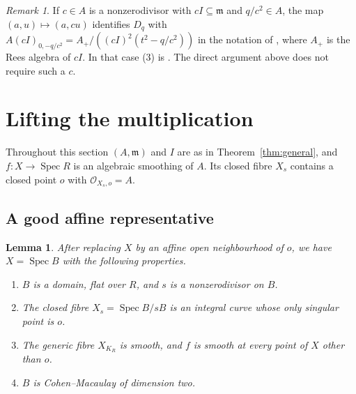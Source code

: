 \documentclass{amsart}
\newtheorem{lemma}[theorem]{Lemma}
\theoremstyle{definition}
\theoremstyle{remark}
\newtheorem{remark}[theorem]{Remark}
\numberwithin{equation}{section}
\newcommand{\m}{\mathfrak{m}}
\DeclareMathOperator{\Spec}{Spec}
\begin{document}
\begin{remark}\label{rem:BDS}
If $c\in A$ is a nonzerodivisor with $cI\subseteq\m$ and $q/c^2\in A$, the map $(a,u)\mapsto(a,cu)$ identifies $D_q$ with $A(cI)_{0,-q/c^2}=A_+/((cI)^2(t^2-q/c^2))$ in the notation of \cite[\S 1]{BDS}, where $A_+$ is the Rees algebra of $cI$. In that case (3) is \cite[Corollary~3.3]{BDS}. The direct argument above does not require such a $c$.
\end{remark}

\section{Lifting the multiplication}\label{sec:general}

Throughout this section $(A,\m)$ and $I$ are as in Theorem~\ref{thm:general}, and $f\colon X\to\Spec R$ is an algebraic smoothing of $A$. Its closed fibre $X_s$ contains a closed point $o$ with $\mathcal O_{X_s,o}=A$.

\subsection{A good affine representative}

\begin{lemma}\label{lem:representative}
After replacing $X$ by an affine open neighbourhood of $o$, we have $X=\Spec B$ with the following properties.
\begin{enumerate}
\item $B$ is a domain, flat over $R$, and $s$ is a nonzerodivisor on $B$.
\item The closed fibre $X_s=\Spec B/sB$ is an integral curve whose only singular point is $o$.
\item The generic fibre $X_{K_R}$ is smooth, and $f$ is smooth at every point of $X$ other than $o$.
\item $B$ is Cohen--Macaulay of dimension two.
\end{enumerate}
\end{lemma}
\end{document}
